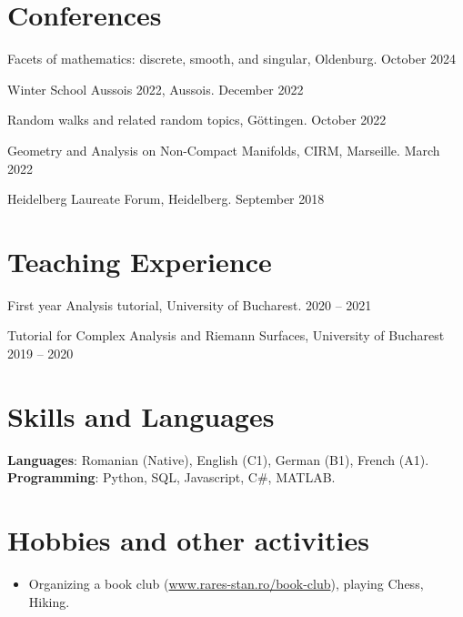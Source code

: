 \documentclass[a4paper, 11pt]{article}
\begin{document}
\section{Conferences}
\begin{itemize}[leftmargin=0.5cm]
	{\item{
			Facets of mathematics: discrete, smooth, and singular, Oldenburg. 
			\hfill
			October 2024
	}}
	{\item{
			Winter School Aussois 2022, Aussois. 
			\hfill
			December 2022
	}}
	{\item{
			Random walks and related random topics, Göttingen. 
			\hfill
			October 2022
	}}
	{\item{
			Geometry and Analysis on Non-Compact Manifolds, CIRM, Marseille.
			\hfill
			March 2022
	}}
	{\item{
			Heidelberg Laureate Forum, Heidelberg.
			\hfill
			September 2018
	}}
	
\end{itemize}

\section{Teaching Experience}
\begin{itemize}[leftmargin=0.5cm]
		{\item{
			First year Analysis tutorial, University of Bucharest.
			\hfill
			2020 -- 2021
	}}
	{\item{
			Tutorial for Complex Analysis and Riemann Surfaces, University of Bucharest
			\hfill
			2019 -- 2020
	}}
\end{itemize}
 
\section{Skills and Languages}
\begin{itemize}[leftmargin=0.5cm, label={}]
	{\item{
			\textbf{Languages}{: Romanian (Native), English (C1), German (B1), French (A1).} \\
			\textbf{Programming}{: Python, SQL, Javascript, C\#, MATLAB.}
	}}
\end{itemize}

\section{Hobbies and other activities}
\begin{itemize}[leftmargin=0.5cm, label={}]
\item{
Organizing a book club (\href{https://www.rares-stan.ro/book-club}{www.rares-stan.ro/book-club}), playing Chess, Hiking.}
\end{itemize}
 
    
\end{document}
